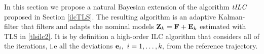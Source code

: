 In this section we propose a natural Bayesian extension of the algorithm $\emph{tILC}$ proposed in Section \ref{ilcTLS}. The resulting algorithm is an adaptive Kalman-filter that filters and adapts the nominal models $\boldsymbol{\mathrm{Z}}_k = \boldsymbol{\mathrm{F}} + \boldsymbol{\mathrm{E}}_k$ estimated with TLS in \eqref{tlsilc2}. It is by definition a high-order ILC algorithm that considers all of the iterations, i.e all the deviations $\boldsymbol{\mathrm{e}}_i, \ i = 1, \ldots, k,$ from the reference trajectory. 


